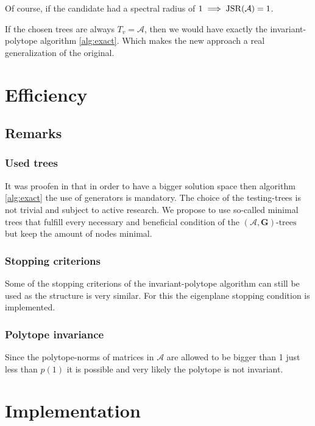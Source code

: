 Of course, if the candidate had a spectral radius of $1 \implies \operatorname{JSR}(\mathcal{A}) = 1$.

\begin{corollary}
  If the chosen trees are always $T_v = \mathcal{A}$, then we would have exactly the invariant-polytope algorithm \ref{alg:exact}. 
  Which makes the new approach a real generalization of the original. \\
\end{corollary}

\section{Efficiency}

\subsection*{Remarks}
\subsubsection*{Used trees}
It was proofen in \citep{mollerTreebasedApproachJoint2014} that in order to have a bigger solution space then algorithm \ref{alg:exact} the use of generators is mandatory. 
The choice of the testing-trees is not trivial and subject to active research. 
We propose to use so-called minimal trees that fulfill every necessary and beneficial condition of the $(\mathcal{A},\mathbf{G})\text{-trees}$ but keep the amount of nodes minimal.

\subsubsection*{Stopping criterions}
Some of the stopping criterions of the invariant-polytope algorithm can still be used as the structure is very similar. 
For this the eigenplane stopping condition is implemented. 

\subsubsection*{Polytope invariance}
Since the polytope-norms of matrices in $\mathcal{A}$ are allowed to be bigger than 1 just less than $p(1)$ it is possible and very likely the polytope is not invariant.

\section{Implementation}

